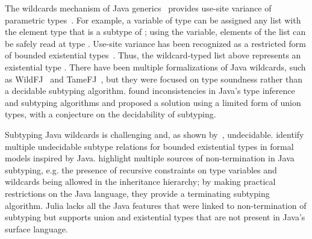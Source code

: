 The wildcards mechanism of Java generics~\cite{torgersen:wildcards:2004}
provides use-site variance of parametric
types~\cite{thorup:unif-genericity:1999}.
For example, a variable of type 
can be assigned any list with the element type that is a subtype of ;
using the variable, elements of the list can be safely read at type .
Use-site variance has been recognized as a restricted form of bounded existential
types~\cite{igarashi:variance:2002}.
Thus, the wildcard-typed list above represents an existential
type .
There have been multiple formalizations of Java wildcards,
such as WildFJ~\cite{torgersen:wildfj:2005} and
TameFJ~\cite{cameron:java-wildcards:2008}, but they
were focused on type soundness rather than a decidable subtyping algorithm.
\citet{smith:java-type-inf:2008} found inconsistencies in Java's type inference
and subtyping algorithms and proposed a solution using a limited form of union
types, with a conjecture on the decidability of subtyping.

Subtyping Java wildcards is challenging and, as shown
by~\citet{grigore:java-undec:2017},
undecidable.
\citet{wehr:dec-bounded-exist:2009} identify multiple undecidable subtype
relations for bounded existential types in formal models inspired by Java.
\citet{tate:taming-wildcards:2011} highlight multiple sources of 
non-termination in Java subtyping,
e.g. the presence of recursive constraints on type variables
and wildcards being allowed in the inheritance hierarchy;
by making practical restrictions on the Java language,
they provide a terminating subtyping algorithm.
Julia lacks all the Java features that were linked to non-termination of
subtyping but supports union and existential types that are not present
in Java's surface language.
